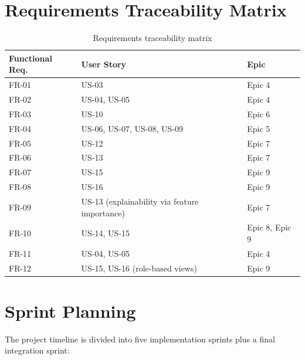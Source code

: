 \section{Requirements Traceability Matrix}

\begin{table}[H]
\centering
\caption{Requirements traceability matrix}
\begin{tabular}{|p{2cm}|p{2cm}|p{6cm}|}
\hline
\textbf{Functional Req.} & \textbf{User Story} & \textbf{Epic} \\
\hline
FR-01 & US-03 & Epic 4 \\
\hline
FR-02 & US-04, US-05 & Epic 4 \\
\hline
FR-03 & US-10 & Epic 6 \\
\hline
FR-04 & US-06, US-07, US-08, US-09 & Epic 5 \\
\hline
FR-05 & US-12 & Epic 7 \\
\hline
FR-06 & US-13 & Epic 7 \\
\hline
FR-07 & US-15 & Epic 9 \\
\hline
FR-08 & US-16 & Epic 9 \\
\hline
FR-09 & US-13 (explainability via feature importance) & Epic 7 \\
\hline
FR-10 & US-14, US-15 & Epic 8, Epic 9 \\
\hline
FR-11 & US-04, US-05 & Epic 4 \\
\hline
FR-12 & US-15, US-16 (role-based views) & Epic 9 \\
\hline
\end{tabular}
\end{table}

\section{Sprint Planning}

The project timeline is divided into five implementation sprints plus a final integration sprint:

